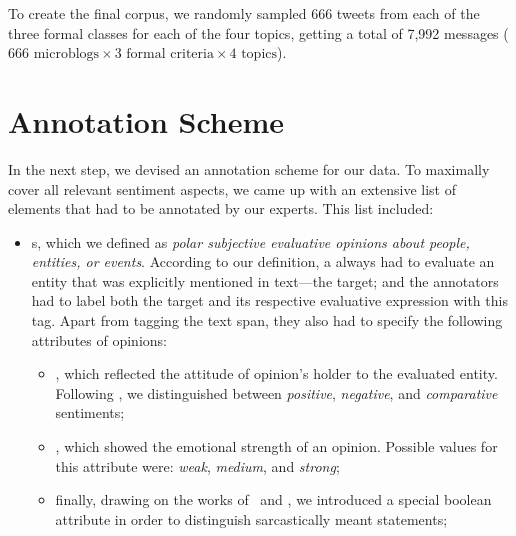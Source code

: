 To create the final corpus, we randomly sampled 666 tweets from each
of the three formal classes for each of the four topics, getting a
total of 7,992 messages ($666\text{ microblogs} \times 3\text{ formal
  criteria} \times 4\text{ topics}$).

\section{Annotation Scheme}\label{subsec:snt:ascheme}

In the next step, we devised an annotation scheme for our data.  To
maximally cover all relevant sentiment aspects, we came up with an
extensive list of elements that had to be annotated by our experts.
This list included:

\begin{itemize}
\item
  \textbf{}s, which we defined as \emph{polar
    subjective evaluative opinions about people, entities, or events}.
  According to our definition, a  always had to
  evaluate an entity that was explicitly mentioned in text---the
  target; and the annotators had to label both the target and its
  respective evaluative expression with this tag. Apart from tagging
  the text span, they also had to specify the following attributes of
  opinions:
  \begin{itemize}
  \item{}, which reflected the attitude of opinion's
    holder to the evaluated entity.  Following
    \citet{Jindal:06a,Jindal:06b}, we distinguished between
    \emph{positive}, \emph{negative}, and \emph{comparative}
    sentiments;
  \item{}, which showed the emotional strength of
    an opinion.  Possible values for this attribute were: \emph{weak},
    \emph{medium}, and \emph{strong};
  \item finally, drawing on the works of~\citet{Bosco:13} and
    \citet{Rosenthal:14}, we introduced a special boolean attribute
     in order to distinguish sarcastically meant
    statements;
  \end{itemize}



\end{itemize}
